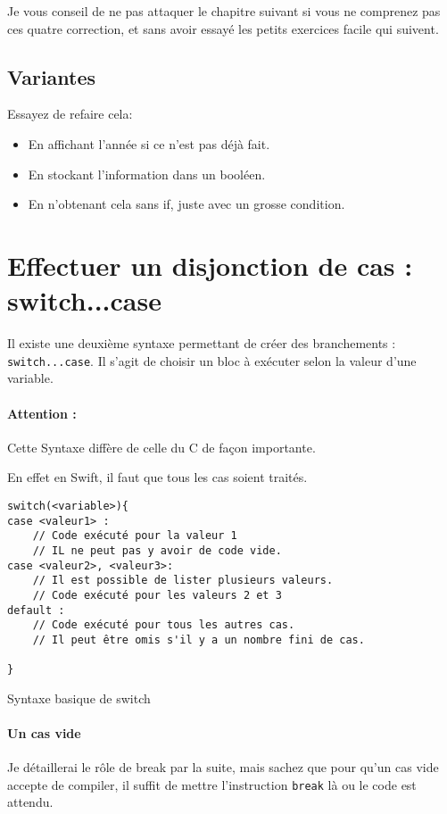 Je vous conseil de ne pas attaquer le chapitre suivant
si vous ne comprenez pas ces quatre correction,
et sans avoir essayé les petits exercices facile qui suivent.
\subsection{Variantes}
Essayez de refaire cela:
\begin{itemize}

\item En affichant l'année si ce n'est pas déjà fait.
\item En stockant l'information dans un booléen.
\item En n'obtenant cela sans if, juste avec un grosse condition.

\end{itemize}
\section{Effectuer un disjonction de cas : switch...case}
Il existe une deuxième syntaxe permettant de créer des branchements :
\texttt{switch...case}.
Il s'agit de choisir un bloc à exécuter selon la valeur d'une variable.
\paragraph{Attention :}Cette Syntaxe diffère de celle du C de façon importante.


En effet en Swift, il faut que tous les cas soient traités.
\begin{listing}[h]
\begin{verbatim}
switch(<variable>){
case <valeur1> :
    // Code exécuté pour la valeur 1
    // IL ne peut pas y avoir de code vide.
case <valeur2>, <valeur3>:
    // Il est possible de lister plusieurs valeurs.
    // Code exécuté pour les valeurs 2 et 3
default :
    // Code exécuté pour tous les autres cas.
    // Il peut être omis s'il y a un nombre fini de cas.

}
\end{verbatim}
\caption{Syntaxe basique de switch}
\end{listing}
\paragraph{Un cas vide}
Je détaillerai le rôle de break par la suite, mais sachez que pour qu'un cas vide accepte de compiler, il suffit de mettre l'instruction \texttt{break} là ou le code est attendu.


